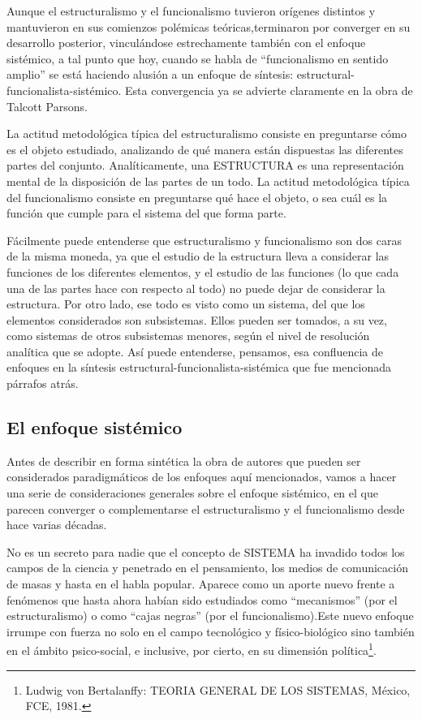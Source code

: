 \documentclass[
]{book}
\begin{document}
Aunque el estructuralismo y el funcionalismo tuvieron orígenes distintos y mantuvieron en sus comienzos polémicas teóricas,terminaron por converger en su desarrollo posterior, vinculándose estrechamente también con el enfoque sistémico, a tal punto que hoy, cuando se habla de ``funcionalismo en sentido amplio'' se está haciendo alusión a un enfoque de síntesis: estructural-funcionalista-sistémico. Esta convergencia ya se advierte claramente en la obra de Talcott Parsons.

La actitud metodológica típica del estructuralismo consiste en preguntarse cómo es el objeto estudiado, analizando de qué manera están dispuestas las diferentes partes del conjunto. Analíticamente, una ESTRUCTURA es una representación mental de la disposición de las partes de un todo. La actitud metodológica típica del funcionalismo consiste en preguntarse qué hace el objeto, o sea cuál es la función que cumple para el sistema del que forma parte.

Fácilmente puede entenderse que estructuralismo y funcionalismo son dos caras de la misma moneda, ya que el estudio de la estructura lleva a considerar las funciones de los diferentes elementos, y el estudio de las funciones (lo que cada una de las partes hace con respecto al todo) no puede dejar de considerar la estructura. Por otro lado, ese todo es visto como un sistema, del que los elementos considerados son subsistemas. Ellos pueden ser tomados, a su vez, como sistemas de otros subsistemas menores, según el nivel de resolución analítica que se adopte. Así puede entenderse, pensamos, esa confluencia de enfoques en la síntesis estructural-funcionalista-sistémica que fue mencionada párrafos atrás.

\hypertarget{el-enfoque-sistuxe9mico}{%
\subsection*{El enfoque sistémico}\label{el-enfoque-sistuxe9mico}}

Antes de describir en forma sintética la obra de autores que pueden ser considerados paradigmáticos de los enfoques aquí mencionados, vamos a hacer una serie de consideraciones generales sobre el enfoque sistémico, en el que parecen converger o complementarse el estructuralismo y el funcionalismo desde hace varias décadas.

No es un secreto para nadie que el concepto de SISTEMA ha invadido todos los campos de la ciencia y penetrado en el pensamiento, los medios de comunicación de masas y hasta en el habla popular. Aparece como un aporte nuevo frente a fenómenos que hasta ahora habían sido estudiados como ``mecanismos'' (por el estructuralismo) o como ``cajas negras'' (por el funcionalismo).Este nuevo enfoque irrumpe con fuerza no solo en el campo tecnológico y físico-biológico sino también en el ámbito psico-social, e inclusive, por cierto, en su dimensión política\footnote{Ludwig von Bertalanffy: TEORIA GENERAL DE LOS SISTEMAS, México, FCE, 1981.}.
\end{document}
